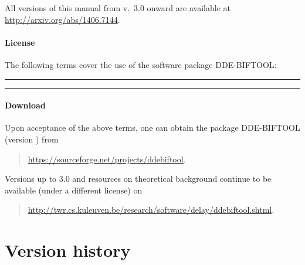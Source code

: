 \documentclass[10pt]{scrartcl}
\newcommand{\DDEBIFCODE}{\textsc{DDE-BIFTOOL}}
\newcommand{\ddebifweb}{\url{https://sourceforge.net/projects/ddebiftool}}
\newcommand{\ddebifarx}{\url{http://arxiv.org/abs/1406.7144}}
\newcommand{\ddebifwebold}{\url{http://twr.cs.kuleuven.be/research/software/delay/ddebiftool.shtml}}
\begin{document}
All versions of this manual from v.~3.0 onward are available at
\ddebifarx{}.
\paragraph{License}
The following terms cover the use of the software package {\DDEBIFCODE}:
\bigskip\hrule
{\ttfamily
\begin{flushleft} {\parindent0pt
    \parskip5pt  }
\end{flushleft}
}
\hrule\bigskip

\paragraph{Download}

Upon acceptance of the above terms, one can obtain the package
{\DDEBIFCODE} (version \version{}) from
\begin{quote}
  \ddebifweb{}.
\end{quote}
Versions up to 3.0 and resources on theoretical background continue to
be available (under a different license) on
\begin{quote}
  \ddebifwebold{}.  
\end{quote}

\section{Version history}
\label{sec:changes}
\end{document}
